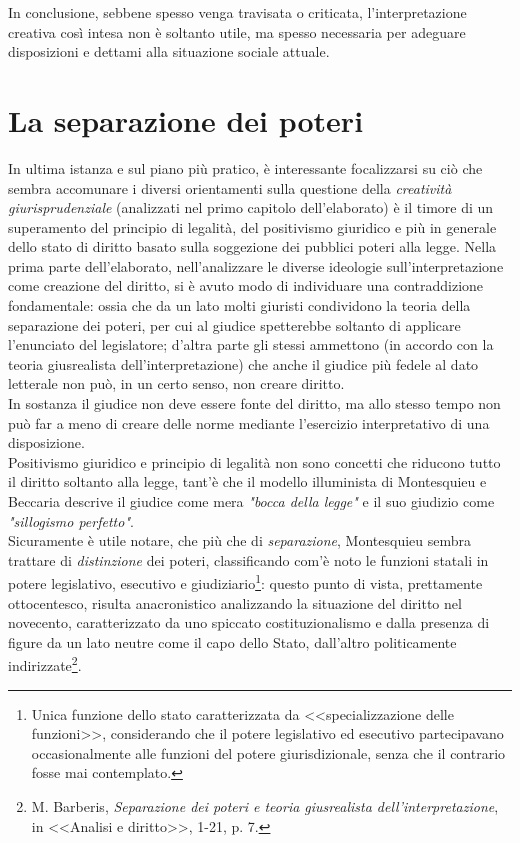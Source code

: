 In conclusione, sebbene spesso venga travisata o criticata, l'interpretazione creativa così intesa non è soltanto utile, ma spesso necessaria per adeguare disposizioni e dettami alla situazione sociale attuale.

\section{La separazione dei poteri}
In ultima istanza e sul piano più pratico, è interessante focalizzarsi su ciò che sembra accomunare i diversi orientamenti sulla questione della \textit{creatività giurisprudenziale} (analizzati nel primo capitolo dell'elaborato) è il timore di un superamento del principio di legalità, del positivismo giuridico e più in generale dello stato di diritto basato sulla soggezione dei pubblici poteri alla legge.
Nella prima parte dell'elaborato, nell'analizzare le diverse ideologie sull'interpretazione come creazione del diritto, si è avuto modo di individuare una contraddizione fondamentale: ossia che da un lato molti giuristi condividono la teoria della separazione dei poteri, per cui al giudice spetterebbe soltanto di applicare l'enunciato del legislatore; d'altra parte gli stessi ammettono (in accordo con la teoria giusrealista dell'interpretazione) che anche il giudice più fedele al dato letterale non può, in un certo senso, non creare diritto.
\\In sostanza il giudice non deve essere fonte del diritto, ma allo stesso tempo non può far a meno di creare delle norme mediante l'esercizio interpretativo di una disposizione.
\\Positivismo giuridico e principio di legalità non sono concetti che riducono tutto il diritto soltanto alla legge, tant'è che il modello illuminista di Montesquieu e Beccaria descrive il giudice come mera \textit{"bocca della legge"} e il suo giudizio come \textit{"sillogismo perfetto"}. 
\\Sicuramente è utile notare, che più che di \textit{separazione}, Montesquieu sembra trattare di \textit{distinzione} dei poteri, classificando com'è noto le funzioni statali in potere legislativo, esecutivo e giudiziario\footnote{Unica funzione dello stato caratterizzata da <<specializzazione delle funzioni>>, considerando che il potere legislativo ed esecutivo partecipavano occasionalmente alle funzioni del potere giurisdizionale, senza che il contrario fosse mai contemplato.}: questo punto di vista, prettamente ottocentesco, risulta anacronistico analizzando la situazione del diritto nel novecento, caratterizzato da uno spiccato costituzionalismo e dalla presenza di figure da un lato neutre come il capo dello Stato, dall'altro politicamente indirizzate\footnote{M. Barberis, \textit{Separazione dei poteri e teoria giusrealista dell'interpretazione}, in <<Analisi e diritto>>, 1-21, p. 7.}.
